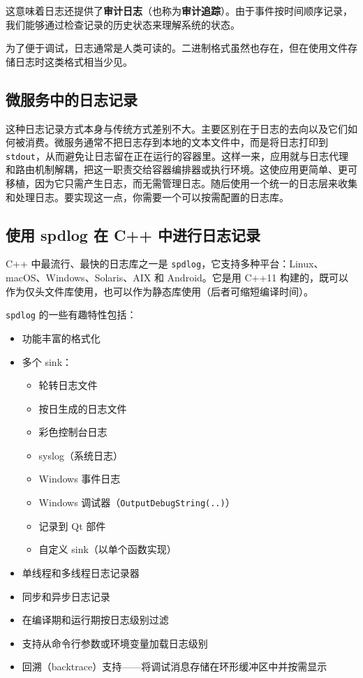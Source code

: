 \label{idx:1843}
\label{idx:1844}
这意味着日志还提供了\textbf{审计日志}（也称为\textbf{审计追踪}）。由于事件按时间顺序记录，我们能够通过检查记录的历史状态来理解系统的状态。

为了便于调试，日志通常是人类可读的。二进制格式虽然也存在，但在使用文件存储日志时这类格式相当少见。

\subsection{微服务中的日志记录}

\label{idx:1845}
\label{idx:1846}
这种日志记录方式本身与传统方式差别不大。主要区别在于日志的去向以及它们如何被消费。微服务通常不把日志存到本地的文本文件中，而是将日志打印到 \texttt{stdout}，从而避免让日志留在正在运行的容器里。这样一来，应用就与日志代理和路由机制解耦，把这一职责交给容器编排器或执行环境。这使应用更简单、更可移植，因为它只需产生日志，而无需管理日志。随后使用一个统一的日志层来收集和处理日志。要实现这一点，你需要一个可以按需配置的日志库。

\subsection{使用 spdlog 在 C++ 中进行日志记录}

\label{idx:1847}
\label{idx:1848}
C++ 中最流行、最快的日志库之一是 \texttt{spdlog}，它支持多种平台：Linux、macOS、Windows、Solaris、AIX 和 Android。它是用 C++11 构建的，既可以作为仅头文件库使用，也可以作为静态库使用（后者可缩短编译时间）。

\texttt{spdlog} 的一些有趣特性包括：

\begin{itemize}
\item 功能丰富的格式化
\item 多个 sink：

\begin{itemize}
\item 轮转日志文件
\item 按日生成的日志文件
\item 彩色控制台日志
\item syslog（系统日志）
\item Windows 事件日志
\item Windows 调试器（\texttt{Output\allowbreak{}Debug\allowbreak{}String(\allowbreak{}.\allowbreak{}.\allowbreak{})\allowbreak{}}）
\item 记录到 Qt 部件
\item 自定义 sink（以单个函数实现）
\end{itemize}
\item 单线程和多线程日志记录器
\item 同步和异步日志记录
\label{idx:1849}
\item 在编译期和运行期按日志级别过滤
\item 支持从命令行参数或环境变量加载日志级别
\item 回溯（backtrace）支持——将调试消息存储在环形缓冲区中并按需显示
\end{itemize}

